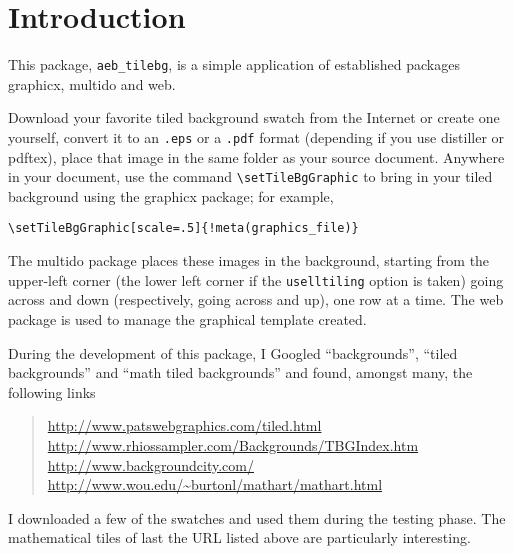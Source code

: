 \documentclass{article}
\let\pkg\textsf
\let\amtIndent\parindent %
\begin{document}
\maketitle

\tableofcontents
{}




\section{Introduction}

This package, \texttt{aeb\_tilebg}, is a simple application
of established packages \textsf{graphicx}, \textsf{multido} and
\pkg{web}.

Download your favorite tiled background swatch from the Internet or create one yourself,
convert it to an \texttt{.eps} or a \texttt{.pdf} format (depending
if you use \textsf{distiller} or \textsf{pdftex}), place that image
in the same folder as your source document. Anywhere in your
document, use the command \verb!\setTileBgGraphic! to bring in your
tiled background using the \textsf{graphicx} package; for example,
\begin{Verbatim}[xleftmargin=\amtIndent,fontsize=\small,commandchars=!()]
\setTileBgGraphic[scale=.5]{!meta(graphics_file)}
\end{Verbatim}
The \textsf{multido} package places these images in the background,
starting from the upper-left corner (the lower left corner if the
\texttt{uselltiling} option is taken) going across and down
(respectively, going across and up), one row at a time. The \pkg{web}
package is used to manage the graphical template created.

During the development of this package, I Googled ``backgrounds'',
``tiled backgrounds'' and ``math tiled backgrounds'' and found,
amongst many, the following links
\begin{quote}
\url{http://www.patswebgraphics.com/tiled.html}\\
\url{http://www.rhiossampler.com/Backgrounds/TBGIndex.htm}\\
\url{http://www.backgroundcity.com/}\\
\url{http://www.wou.edu/~burtonl/mathart/mathart.html}
\end{quote}
I downloaded a few of the swatches and used them during the testing
phase. The mathematical tiles of last the URL listed above are
particularly interesting.
\end{document}
